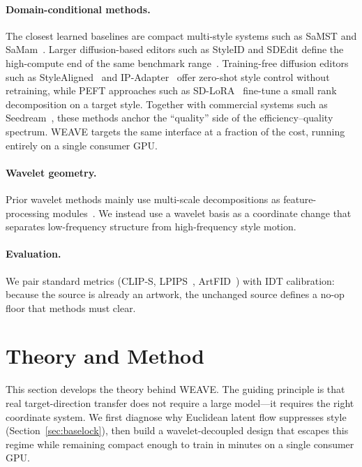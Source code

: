 \documentclass[letterpaper]{article}
\begin{document}
\paragraph{Domain-conditional methods.}
The closest learned baselines are compact multi-style systems such as SaMST and SaMam~\cite{liu2024samst,liu2024samam}.
Larger diffusion-based editors such as StyleID and SDEdit define the high-compute end of the same benchmark range~\cite{meng2021sdedit,chung2024styleid}.
Training-free diffusion editors such as StyleAligned~\cite{gal2022stylealigned} and IP-Adapter~\cite{ye2023ipadapter} offer zero-shot style control without retraining, while PEFT approaches such as SD-LoRA~\cite{hu2022lora} fine-tune a small rank decomposition on a target style.
Together with commercial systems such as Seedream~\cite{zhang2024artbank}, these methods anchor the ``quality'' side of the efficiency--quality spectrum.
WEAVE targets the same interface at a fraction of the cost, running entirely on a single consumer GPU.

\paragraph{Wavelet geometry.}
Prior wavelet methods mainly use multi-scale decompositions as feature-processing modules~\cite{daubechies1992ten,phung2023wavelet}.
We instead use a wavelet basis as a coordinate change that separates low-frequency structure from high-frequency style motion.

\paragraph{Evaluation.}
We pair standard metrics (CLIP-S, LPIPS~\cite{zhang2018lpips}, ArtFID~\cite{wright2022artfid}) with IDT calibration: because the source is already an artwork, the unchanged source defines a no-op floor that methods must clear.

\section{Theory and Method}
\label{sec:method}

This section develops the theory behind WEAVE. The guiding principle is that real target-direction transfer does not require a large model---it requires the right coordinate system. We first diagnose why Euclidean latent flow suppresses style (Section~\ref{sec:baselock}), then build a wavelet-decoupled design that escapes this regime while remaining compact enough to train in minutes on a single consumer GPU.
\end{document}
